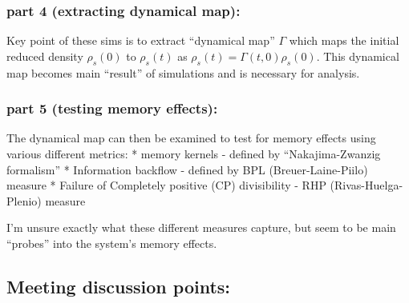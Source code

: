 \documentclass[
  letterpaper,
  DIV=11,
  numbers=noendperiod]{scrartcl}
\begin{document}
\subsubsection{part 4 (extracting dynamical
map):}\label{part-4-extracting-dynamical-map}

Key point of these sims is to extract ``dynamical map'' \(\Gamma\) which
maps the initial reduced density \(\rho_{s}(0)\) to \(\rho_{s}(t)\) as
\(\rho_{s}(t) = \Gamma(t, 0)\rho_{s}(0)\). This dynamical map becomes
main ``result'' of simulations and is necessary for analysis.

\subsubsection{part 5 (testing memory
effects):}\label{part-5-testing-memory-effects}

The dynamical map can then be examined to test for memory effects using
various different metrics: * memory kernels - defined by
``Nakajima-Zwanzig formalism'' * Information backflow - defined by BPL
(Breuer-Laine-Piilo) measure * Failure of Completely positive (CP)
divisibility - RHP (Rivas-Huelga-Plenio) measure

I'm unsure exactly what these different measures capture, but seem to be
main ``probes'' into the system's memory effects.

\subsection{Meeting discussion points:}\label{meeting-discussion-points}
\end{document}
